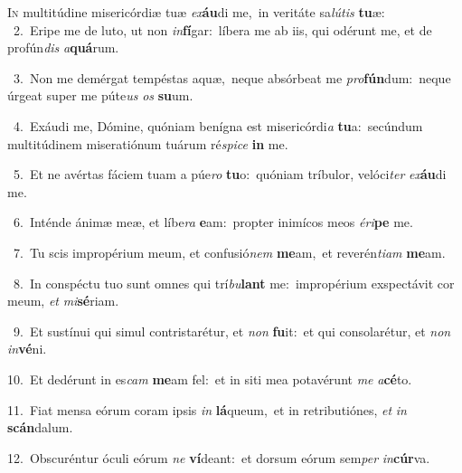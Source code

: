 \lettrine{\initial\textcolor{\initialcolor}{I}}{n} multitúdine misericórdiæ tuæ \textit{ex}\-\textbf{áu}di me,~\star in veritáte sa\-\textit{lú}\-\textit{tis} \textbf{tu}\-æ:\\
{\numbfont\textcolor{\numbcolor}{~2.}}~Eripe me de luto, ut non \textit{in}\-\textbf{fí}gar:~\star líbera me ab iis, qui odérunt me, et de profún\textit{dis} \textit{a}\-\textbf{quá}rum.\par
{\numbfont\textcolor{\numbcolor}{~3.}}~Non me demérgat tempéstas aquæ,~\dagger neque absórbeat me \textit{pro}\-\textbf{fún}dum:~\star neque úrgeat super me púte\textit{us} \textit{os} \textbf{su}\-um.\par
{\numbfont\textcolor{\numbcolor}{~4.}}~Exáudi me, Dómine, quóniam benígna est misericórdi\textit{a} \textbf{tu}\-a:~\star secúndum multitúdinem miseratiónum tuárum ré\-\textit{spi}\-\textit{ce} \textbf{in} me.\par
{\numbfont\textcolor{\numbcolor}{~5.}}~Et ne avértas fáciem tuam a púe\textit{ro} \textbf{tu}\-o:~\star quóniam tríbulor, velóci\textit{ter} \textit{ex}\-\textbf{áu}di me.\par
{\numbfont\textcolor{\numbcolor}{~6.}}~Inténde ánimæ meæ, et líbe\textit{ra} \textbf{e}\-am:~\star propter inimícos meos \textit{é}\-\textit{ri}\textbf{pe} me.\par
{\numbfont\textcolor{\numbcolor}{~7.}}~Tu scis impropérium meum, et confusió\textit{nem} \textbf{me}\-am,~\star et reverén\-\textit{ti}\-\textit{am} \textbf{me}\-am.\par
{\numbfont\textcolor{\numbcolor}{~8.}}~In conspéctu tuo sunt omnes qui trí\-\textit{bu}\-\textbf{lant} me:~\star impropérium exspectávit cor meum, \textit{et} \textit{mi}\-\textbf{sé}riam.\par
{\numbfont\textcolor{\numbcolor}{~9.}}~Et sustínui qui simul contristarétur, et \textit{non} \textbf{fu}\-it:~\star et qui consolarétur, et \textit{non} \textit{in}\-\textbf{vé}ni.\par
{\numbfont\textcolor{\numbcolor}{10.}}~Et dedérunt in es\textit{cam} \textbf{me}\-am fel:~\star et in siti mea potavérunt \textit{me} \textit{a}\-\textbf{cé}to.\par
{\numbfont\textcolor{\numbcolor}{11.}}~Fiat mensa eórum coram ipsis \textit{in} \textbf{lá}\-queum,~\star et in retributiónes, \textit{et} \textit{in} \textbf{scán}\-dalum.\par
{\numbfont\textcolor{\numbcolor}{12.}}~Obscuréntur óculi eórum \textit{ne} \textbf{ví}\-deant:~\star et dorsum eórum sem\textit{per} \textit{in}\-\textbf{cúr}va.\par
